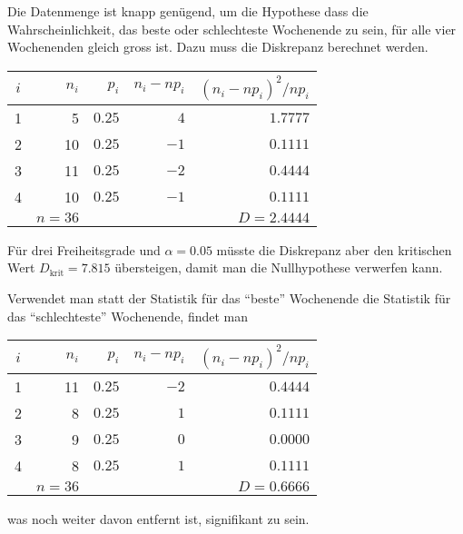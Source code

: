 \begin{loesung}
Die Datenmenge ist knapp genügend, um die Hypothese
dass die Wahrscheinlichkeit, das beste oder schlechteste Wochenende zu sein,
für alle vier Wochenenden gleich gross ist.
Dazu muss die Diskrepanz berechnet werden.
\begin{center}
\begin{tabular}{|crrrr|}
\hline
$i$& $n_i$& $p_i$&$n_i-np_i$&$(n_i-np_i)^2/np_i$\\
\hline
  1&     5&$0.25$&$ 4$&$1.7777$\\
  2&    10&$0.25$&$-1$&$0.1111$\\
  3&    11&$0.25$&$-2$&$0.4444$\\
  4&    10&$0.25$&$-1$&$0.1111$\\
\hline
   &$n=36$&      &      &$D=2.4444$\\
\hline
\end{tabular}
\end{center}
Für drei Freiheitsgrade und $\alpha=0.05$ müsste die Diskrepanz
aber den kritischen Wert $D_{\text{krit}}=7.815$ übersteigen, damit
man die Nullhypothese verwerfen kann.

Verwendet man statt der Statistik für das ``beste'' Wochenende
die Statistik für das ``schlechteste'' Wochenende, findet man
\begin{center}
\begin{tabular}{|crrrr|}
\hline
$i$& $n_i$& $p_i$&$n_i-np_i$&$(n_i-np_i)^2/np_i$\\
\hline
  1&    11&$0.25$&$-2$&$0.4444$\\
  2&     8&$0.25$&$1$&$0.1111$\\
  3&     9&$0.25$&$0$&$0.0000$\\
  4&     8&$0.25$&$1$&$0.1111$\\
\hline
   &$n=36$&      &      &$D=0.6666$\\
\hline
\end{tabular}
\end{center}
was noch weiter davon entfernt ist, signifikant zu sein.
\end{loesung}

